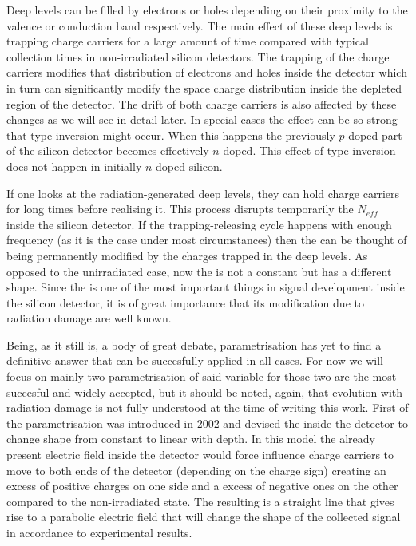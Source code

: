 Deep levels can be filled by electrons or holes depending on their proximity to the valence or conduction band respectively. The main effect of these deep levels is trapping charge carriers for a large amount of time compared with typical collection times in non-irradiated silicon detectors. The trapping of the charge carriers modifies that distribution of electrons and holes inside the detector which in turn can significantly modify the space charge distribution inside the depleted region of the detector. The drift of both charge carriers is also affected by these changes as we will see in detail later. In special cases the effect can be so strong that type inversion might occur. When this happens the previously $p$ doped part of the silicon detector becomes effectively $n$ doped. This effect of type inversion does not happen in initially $n$ doped silicon.

If one looks at the radiation-generated deep levels, they can hold charge carriers for long times before realising it. This process disrupts temporarily the $N_{eff}$ inside the silicon detector. If the trapping-releasing cycle happens with enough frequency (as it is the case under most circumstances) then the \neff can be thought of being permanently modified by the charges trapped in the deep levels. As opposed to the unirradiated case, now the \neff is not a constant but has a different shape. Since the \neff is one of the most important things in signal development inside the silicon detector, it is of great importance that its modification due to radiation damage are well known.

Being, as it still is, a body of great debate, \neff parametrisation has yet to find a definitive answer that can be succesfully applied in all cases. For now we will focus on mainly two parametrisation of said variable for those two are the most succesful and widely accepted, but it should be noted, again, that \neff evolution with radiation damage is not fully understood at the time of writing this work. First of the parametrisation was introduced in 2002 and devised the \neff inside the detector to change shape from constant to linear with depth. In this model the already present electric field inside the detector would force influence charge carriers to move to both ends of the detector (depending on the charge sign) creating an excess of positive charges on one side and a excess of negative ones on the other compared to the non-irradiated state. The resulting \neff is a straight line that gives rise to a parabolic electric field that will change the shape of the collected signal in accordance to experimental results.

